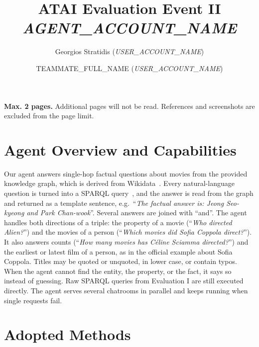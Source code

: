 \documentclass{article}
\begin{document}
\title{ATAI Evaluation Event II\\[0.3em]
\large \textit{AGENT\_ACCOUNT\_NAME}}

\author{
Georgios Stratidis (\textit{USER\_ACCOUNT\_NAME})
\and
TEAMMATE\_FULL\_NAME (\textit{USER\_ACCOUNT\_NAME})
}

\date{}

\maketitle
\noindent
\textbf{Max. 2 pages.} Additional pages will not be read.
References and screenshots are excluded from the page limit.

\section{Agent Overview and Capabilities}

Our agent answers single-hop factual questions about movies from the provided knowledge graph, which is derived from Wikidata~\cite{vrandecic2014wikidata}. Every natural-language question is turned into a SPARQL query~\cite{harris2013sparql}, and the answer is read from the graph and returned as a template sentence, e.g.\ ``\textit{The factual answer is: Jeong Seo-kyeong and Park Chan-wook}''. Several answers are joined with ``and''. The agent handles both directions of a triple: the property of a movie (``\textit{Who directed Alien?}'') and the movies of a person (``\textit{Which movies did Sofia Coppola direct?}''). It also answers counts (``\textit{How many movies has Céline Sciamma directed?}'') and the earliest or latest film of a person, as in the official example about Sofia Coppola. Titles may be quoted or unquoted, in lower case, or contain typos. When the agent cannot find the entity, the property, or the fact, it says so instead of guessing. Raw SPARQL queries from Evaluation I are still executed directly. The agent serves several chatrooms in parallel and keeps running when single requests fail.

\section{Adopted Methods}
\end{document}
